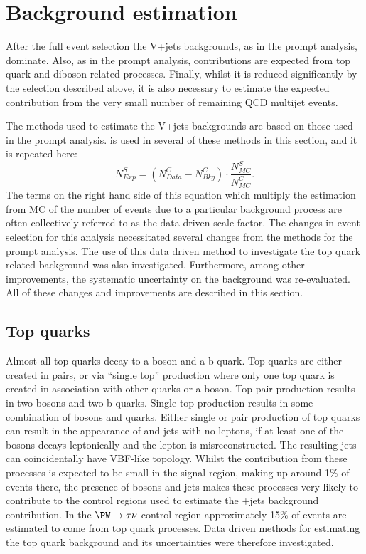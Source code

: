 \section{Background estimation}                                                                                                                          
\label{sec:parkedbkg}
After the full event selection the V+jets backgrounds, as in the prompt analysis, dominate. Also, as in the prompt analysis, contributions are expected from top quark and diboson related processes. Finally, whilst it is reduced significantly by the selection described above, it is also necessary to estimate the expected contribution from the very small number of remaining \ac{QCD} multijet events.

The methods used to estimate the V+jets backgrounds are based on those used in the prompt analysis.  is used in several of these methods in this section, and it is repeated here:
\begin{equation}
  \label{eq:wdatabkgrep}
  N^{S}_{Exp}=\left(N^{C}_{Data}-N^{C}_{Bkg}\right)\cdot\frac{N^{S}_{MC}}{N^{C}_{MC}}.
\end{equation}
The terms on the right hand side of this equation which multiply the estimation from \ac{MC} of the number of events due to a particular background process are often collectively referred to as the data driven scale factor. The changes in event selection for this analysis necessitated several changes from the methods for the prompt analysis. The use of this data driven method to investigate the top quark related background was also investigated. Furthermore, among other improvements, the systematic uncertainty on the \Znunu background was re-evaluated. All of these changes and improvements are described in this section.

\subsection{Top quarks}
\label{sec:parkedtop}
Almost all top quarks decay to a \PW boson and a b quark. Top quarks are either created in pairs, or via ``single top'' production where only one top quark is created in association with  other quarks or a \PW boson. Top pair production results in two \PW bosons and two b quarks. Single top production results in some combination of \PW bosons and quarks. Either single or pair production of top quarks can result in the appearance of \MET and jets with no leptons, if at least one of the \PW bosons decays leptonically and the lepton is misreconstructed. The resulting jets can coincidentally have \ac{VBF}-like topology. Whilst the contribution from these processes is expected to be small in the signal region, making up around 1\% of events there, the presence of \PW bosons and jets makes these processes very likely to contribute to the control regions used to estimate the \PW+jets background contribution. In the $\PW\rightarrow\tau\nu$ control region approximately 15\% of events are estimated to come from top quark processes. Data driven methods for estimating the top quark background and its uncertainties were therefore investigated.

